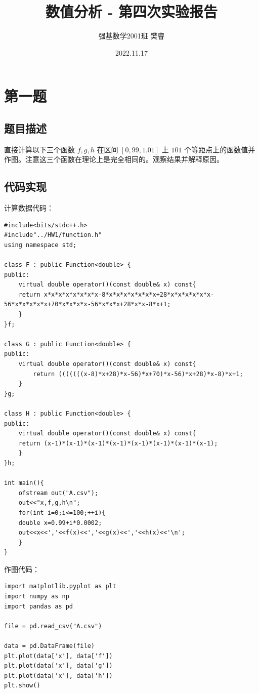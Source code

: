 \documentclass{ctexart}
\title{数值分析 - 第四次实验报告}
\author{强基数学2001班 樊睿}
\date{2022.11.17}
\begin{document}
\maketitle

\section{第一题}

\subsection{题目描述}

直接计算以下三个函数 $f,g,h$ 在区间 $[0,99,1.01]$ 上 $101$ 个等距点上的函数值并作图。注意这三个函数在理论上是完全相同的。观察结果并解释原因。

\subsection{代码实现}

计算数据代码：

\begin{verbatim}
#include<bits/stdc++.h>
#include"../HW1/function.h"
using namespace std;

class F : public Function<double> {
public:
    virtual double operator()(const double& x) const{
    return x*x*x*x*x*x*x*x-8*x*x*x*x*x*x*x+28*x*x*x*x*x*x-56*x*x*x*x*x+70*x*x*x*x-56*x*x*x+28*x*x-8*x+1;
    }
}f;

class G : public Function<double> {
public:
    virtual double operator()(const double& x) const{
        return (((((((x-8)*x+28)*x-56)*x+70)*x-56)*x+28)*x-8)*x+1;
    }
}g;

class H : public Function<double> {
public:
    virtual double operator()(const double& x) const{
    return (x-1)*(x-1)*(x-1)*(x-1)*(x-1)*(x-1)*(x-1)*(x-1);
    }
}h;

int main(){
    ofstream out("A.csv");
    out<<"x,f,g,h\n";
    for(int i=0;i<=100;++i){
    double x=0.99+i*0.0002;
    out<<x<<','<<f(x)<<','<<g(x)<<','<<h(x)<<'\n';
    }
}
\end{verbatim}

作图代码：

\begin{verbatim}
import matplotlib.pyplot as plt
import numpy as np
import pandas as pd

file = pd.read_csv("A.csv")

data = pd.DataFrame(file)
plt.plot(data['x'], data['f'])
plt.plot(data['x'], data['g'])
plt.plot(data['x'], data['h'])
plt.show()
\end{verbatim}
\end{document}
